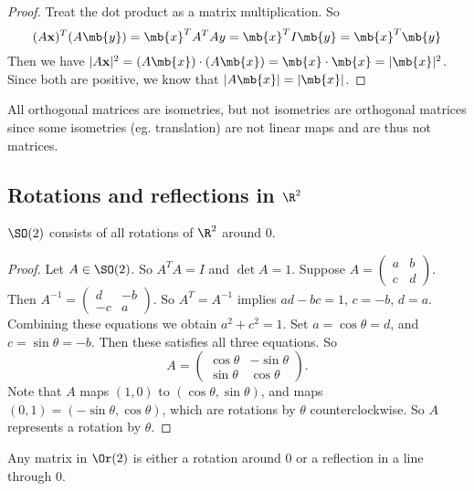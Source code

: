 \documentclass[a4paper]{article}
\begin{document}
  \begin{proof}
    Treat the dot product as a matrix multiplication. So
    \[
      (A\mathbf{x})^T(A\mb{y}) = \mb{x}^{T}A^TAy = \mb{x}^TI\mb{y} = \mb{x}^T\mb{y}
    \]
    Then we have $|A\mathbf{x}|^2 = (A\mb{x})\cdot (A\mb{x}) = \mb{x}\cdot \mb{x} = |\mb{x}|^2$. Since both are positive, we know that $|A\mb{x}| = |\mb{x}|$.
  \end{proof}
  \note All orthogonal matrices are isometries, but not isometries are orthogonal matrices since some isometries (eg. translation) are not linear maps and are thus not matrices.
  \subsection{Rotations and reflections in \texorpdfstring{$\R^2$}{R2}}
  \begin{lemma}
    $\SO(2)$ consists of all rotations of $\R^2$ around 0.
  \end{lemma}

  \begin{proof}
    Let $A\in \SO(2)$. So $A^TA = I$ and $\det A = 1$. Suppose $A = 
    \begin{pmatrix}
      a & b\\c & d
    \end{pmatrix}$. Then $A^{-1} = 
    \begin{pmatrix}
      d & -b\\-c & a
    \end{pmatrix}.$ So $A^T = A^{-1}$ implies $ad - bc = 1$, $c = -b$, $d = a$. Combining these equations we obtain $a^2 + c^2 = 1$. Set $a = \cos\theta = d$, and $c = \sin\theta = -b$. Then these satisfies all three equations. So
    \[
      A = 
      \begin{pmatrix}
        \cos\theta & -\sin\theta\\
        \sin\theta & \cos\theta
      \end{pmatrix}.
    \]
    Note that $A$ maps $(1, 0)$ to $(\cos\theta, \sin \theta)$, and maps $(0, 1)= (-\sin\theta, \cos\theta)$, which are rotations by $\theta$ counterclockwise. So $A$ represents a rotation by $\theta$.
  \end{proof}

  \begin{cor}
    Any matrix in $\Or(2)$ is either a rotation around $0$ or a reflection in a line through $0$.
  \end{cor}
\end{document}
